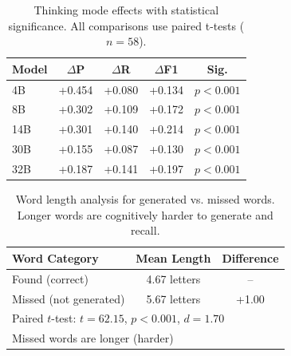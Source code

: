



\begin{table}[t]
\centering
\small
\caption{Thinking mode effects with statistical significance. All comparisons use paired t-tests ($n=58$).}
\label{tab:thinking_mode}
\begin{tabular}{lcccc}
\toprule
\textbf{Model} & \textbf{$\Delta$P} & \textbf{$\Delta$R} & \textbf{$\Delta$F1} & \textbf{Sig.} \\
\midrule
4B  & +0.454 & +0.080 & +0.134 & $p < 0.001$ \\
8B  & +0.302 & +0.109 & +0.172 & $p < 0.001$ \\
14B & +0.301 & +0.140 & +0.214 & $p < 0.001$ \\
30B & +0.155 & +0.087 & +0.130 & $p < 0.001$ \\
32B & +0.187 & +0.141 & +0.197 & $p < 0.001$ \\
\bottomrule
\end{tabular}
\end{table}




\begin{table}[t]
\centering
\small
\caption{Word length analysis for generated vs. missed words. Longer words are cognitively harder to generate and recall.}
\label{tab:length_difficulty}
\begin{tabular}{lcc}
\toprule
\textbf{Word Category} & \textbf{Mean Length} & \textbf{Difference} \\
\midrule
Found (correct) & 4.67 letters & -- \\
Missed (not generated) & 5.67 letters & +1.00 \\
\midrule
\multicolumn{3}{l}{Paired $t$-test: $t = 62.15$, $p < 0.001$, $d = 1.70$} \\
\multicolumn{3}{l}{Missed words are longer (harder)} \\
\bottomrule
\end{tabular}
\end{table}




